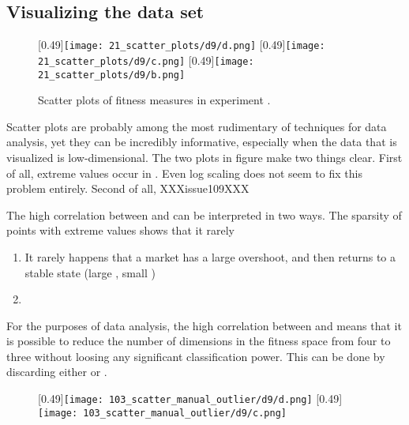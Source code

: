 \subsection{Visualizing the data set}
\begin{figure}
\centering
{}
[0.49\linewidth]{\texttt{[image: 21\_scatter\_plots/d9/d.png]}}
[0.49\linewidth]{\texttt{[image: 21\_scatter\_plots/d9/c.png]}}
[0.49\linewidth]{\texttt{[image: 21\_scatter\_plots/d9/b.png]}}
\caption{Scatter plots of fitness measures in experiment \dnine. }
\label{figure:scatter_log_transform}
\end{figure}

Scatter plots are probably among the most rudimentary of techniques for data analysis, yet they can be incredibly informative, especially when the data that is visualized is low-dimensional.
The two plots in figure make two things clear. First of all, extreme values occur in \stdev. Even log scaling does not seem to fix this problem entirely. Second of all, XXXissue109XXX

The high correlation between \stdev and \overshoot can be interpreted in two ways. 
The sparsity of points with extreme values shows that it rarely


\begin{enumerate}
\item It rarely happens that a market has a large overshoot, and then returns to a stable state (large \overshoot, small \stdev)
\item 
\end{enumerate}

For the purposes of data analysis, the high correlation between \stdev and \overshoot means that it is possible to reduce the number of dimensions in the fitness space from four to three without loosing any significant classification power. This can be done by discarding either \stdev or \overshoot. %


\begin{figure}
[0.49\linewidth]{\texttt{[image: 103\_scatter\_manual\_outlier/d9/d.png]}}
[0.49\linewidth]{\texttt{[image: 103\_scatter\_manual\_outlier/d9/c.png]}}
\caption{}
\label{fig:}
\end{figure}


